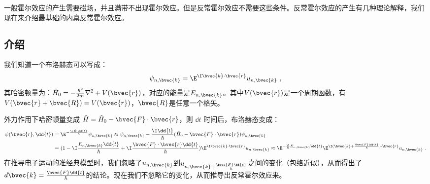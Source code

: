 \begin{issues}
\issueDraft
\end{issues}
一般霍尔效应的产生需要磁场，并且满带不出现霍尔效应。但是反常霍尔效应不需要这些条件。反常霍尔效应的产生有几种理论解释，我们现在来介绍最基础的内禀反常霍尔效应。
\subsection{介绍}
我们知道一个布洛赫态可以写成：
\begin{equation}
\psi_{n,\bvec{k}}=\E^{\I\bvec{k}\cdot\bvec{r}}u_{n,\bvec{k}}~,
\end{equation}
其哈密顿量为：$\hat H_0=-\frac{\hbar^2}{2m}\nabla^2+V(\bvec{r})$，对应的能量是$E_{n,\bvec{k}}$。其中$V(\bvec{r})$是一个周期函数，有$V(\bvec{r}+\bvec{R})=V(\bvec{r})$，$\bvec{R}$是任意一个格矢。

外力作用下哈密顿量变成 $\hat H =\hat H_0 -\bvec{F}\cdot\bvec{r}$，则 $\dd{t}$ 时间后，布洛赫态变成：
\begin{equation}
\begin{aligned}
\psi(\bvec{r},\dd{t})&=\E^{-\frac{\I\,\hat H\,\dd{t}}{\hbar}}\psi_{n,\bvec{k}} \approx \psi_{n,\bvec{k}}-\frac{\I\dd{t}}{\hbar}(\hat H_0 -\bvec{F}\cdot\bvec{r})\psi_{n,\bvec{k}}\\
&=(1-\I \frac{E_{n,\bvec{k}}\dd{t}}{\hbar}+\I\frac{\bvec{F}\cdot\bvec{r}\dd{t}}{\hbar})\E^{\I\bvec{k}\cdot\bvec{r}}u_{n,\bvec{k}}
\approx \E^{-\frac{\I}{\hbar}E_{n,\bvec{k}}\dd{t}}\E^{\I(\bvec{k}+\frac{\bvec{F}\dd{t}}{\hbar})\cdot \bvec{r}}u_{n,\bvec{k}}~.
\end{aligned}
\end{equation}
在推导电子运动的准经典模型时，我们忽略了$u_{n,\bvec{k}}$到$u_{n,\bvec{k}+\frac{\bvec{F}\dd{t}}{\hbar}}$之间的变化（包络近似），从而得出了$d\bvec{k}=\frac{\bvec{F}\dd{t}}{\hbar}$的结论。现在我们不忽略它的变化，从而推导出反常霍尔效应来。

